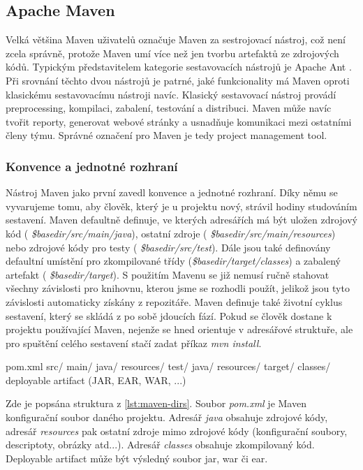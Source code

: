 \documentclass[11pt,twoside,a4paper]{book}
\begin{document}
\subsection{Apache Maven}

Velká většina Maven \cite{Maven08} uživatelů označuje Maven za sestrojovací nástroj,
což není zcela správně, protože Maven umí více než jen tvorbu artefaktů ze zdrojových kódů. Typickým představitelem
kategorie sestavovacích nástrojů je Apache Ant \cite{AntHome}. Při srovnání těchto dvou
nástrojů je patrné, jaké funkcionality má Maven oproti klasickému sestavovacímu
nástroji navíc. Klasický sestavovací nástroj provádí preprocessing, kompilaci, zabalení, testování a distribuci. Maven může navíc tvořit reporty,
generovat webové stránky a usnadňuje komunikaci mezi ostatními členy týmu. Správné
označení pro Maven je tedy project management tool.

\subsubsection{Konvence a jednotné rozhraní}

Nástroj Maven jako první zavedl konvence a jednotné rozhraní. Díky němu se
vyvarujeme tomu, aby člověk, který je u projektu nový, strávil hodiny studováním
sestavení.
Maven defaultně definuje, ve kterých adresářích má být uložen zdrojový kód ({\em
\${basedir}/src/main/java}), ostatní zdroje ({\em
\${basedir}/src/main/resources}) nebo zdrojové kódy pro testy ({\em
\${basedir}/src/test}). Dále jsou také definovány defaultní umístění pro
zkompilované třídy ({\em \${basedir}/target/classes}) a zabalený artefakt ({\em
\${basedir}/target}). S použitím Mavenu se již nemusí ručně stahovat všechny
závislosti pro knihovnu, kterou jsme se rozhodli použít, jelikož jsou tyto
závislosti automaticky získány z repozitáře. Maven definuje také životní cyklus
sestavení, který se skládá z po sobě jdoucích fází.
Pokud se člověk dostane k projektu používající Maven, nejenže se hned orientuje
v adresářové struktuře, ale pro spuštění celého sestavení stačí zadat příkaz
{\em mvn install}.

\begin{code}[frame=single, caption={Defaultní adresářová struktura Maven
projektu}, label={lst:maven-dirs}] pom.xml
src/
  main/
    java/
    resources/
  test/
    java/
    resources/
target/
  classes/
  deployable artifact (JAR, EAR, WAR, ...)
\end{code}

Zde je popsána struktura z \ref{lst:maven-dirs}. Soubor {\em pom.xml} je Maven
konfigurační soubor daného projektu.
Adresář {\em java} obsahuje zdrojové kódy, adresář {\em resources} pak ostatní zdroje mimo
zdrojové kódy (konfigurační soubory, descriptoty, obrázky atd...). Adresář {\em
classes} obsahuje zkompilovaný kód. Deployable artifact může být výsledný soubor
jar, war či ear.
\end{document}
